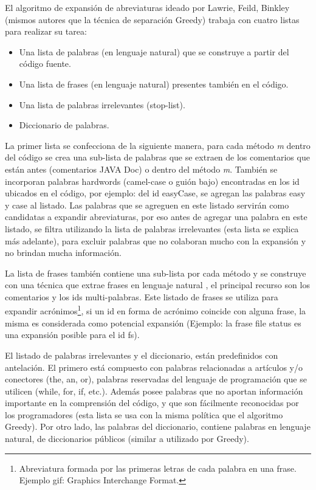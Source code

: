 El algoritmo de expansión de abreviaturas ideado por Lawrie, Feild, Binkley (mismos autores que la técnica de separación Greedy) \cite{LFBEX07} trabaja con cuatro listas para realizar su tarea:

\begin{itemize}
\itemsep0em%
\item Una lista de palabras (en lenguaje natural) que se construye a partir del código fuente.
\item Una lista de frases (en lenguaje natural) presentes también en el código.
\item Una lista de palabras irrelevantes (stop-list).
\item Diccionario de palabras.
\end{itemize}


La primer lista se confecciona de la siguiente manera, para cada método \textit{m} dentro del código se crea una sub-lista de palabras que se extraen de los comentarios que están antes (comentarios JAVA Doc) o dentro del método \textit{m}. También se incorporan palabras hardwords (camel-case o guión bajo) encontradas en los id ubicados en el código, por ejemplo: del id \textsf{easyCase}, se agregan las palabras \textsf{easy} y \textsf{case} al listado. Las palabras que se agreguen en este listado servirán como candidatas a expandir abreviaturas, por eso antes de agregar una palabra en este listado, se filtra utilizando la lista de palabras irrelevantes (esta lista se explica más adelante), para excluir palabras que no colaboran mucho con la expansión y no brindan mucha información.

La lista de frases también contiene una sub-lista por cada método y se construye con una técnica que extrae frases en lenguaje natural \cite{FFCW01}, el principal recurso son los comentarios y los ids multi-palabras. Este listado de frases se utiliza para expandir acrónimos\footnote[1]{Abreviatura formada por las primeras letras de cada palabra en una frase. Ejemplo gif: Graphics Interchange Format.}, si un id en forma de acrónimo coincide con alguna frase, la misma es considerada como potencial expansión \cite{LOPT00} (Ejemplo: la frase \textsf{file status} es una expansión posible para el id \textsf{fs}).

El listado de palabras irrelevantes y el diccionario, están predefinidos con antelación. El primero está compuesto con palabras relacionadas a artículos y/o conectores (the, an, or), palabras reservadas del lenguaje de programación que se utilicen (\textsf{while, for, if,} etc.). Además posee palabras que no aportan información importante en la comprensión del código, y que son fácilmente reconocidas por los programadores (esta lista se usa con la misma política que el algoritmo Greedy). Por otro lado, las palabras del diccionario, contiene palabras en lenguaje natural, de diccionarios públicos (similar a utilizado por Greedy).

